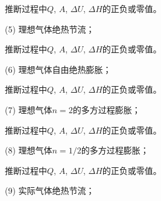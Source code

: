 \documentclass[CJK]{beamer}
\begin{document}
\begin{frame}
\bch


推断过程中$Q$, $A$, $\Delta U$, $\Delta H$的正负或零值。

\bitem
\item[(5)]{理想气体绝热节流；}
\eitem

\ech
\end{frame}

\begin{frame}
\bch


推断过程中$Q$, $A$, $\Delta U$, $\Delta H$的正负或零值。

\bitem
\item[(6)]{理想气体自由绝热膨胀；}
\eitem

\ech
\end{frame}


\begin{frame}
\bch


推断过程中$Q$, $A$, $\Delta U$, $\Delta H$的正负或零值。

\bitem
\item[(7)]{理想气体$n=2$的多方过程膨胀；}
\eitem

\ech
\end{frame}

\begin{frame}
\bch


推断过程中$Q$, $A$, $\Delta U$, $\Delta H$的正负或零值。

\bitem
\item[(8)]{理想气体$n=1/2$的多方过程膨胀；}
\eitem

\ech
\end{frame}

\begin{frame}
\bch


推断过程中$Q$, $A$, $\Delta U$, $\Delta H$的正负或零值。

\bitem
\item[(9)]{实际气体绝热节流；}
\eitem

\ech
\end{frame}
\end{document}
